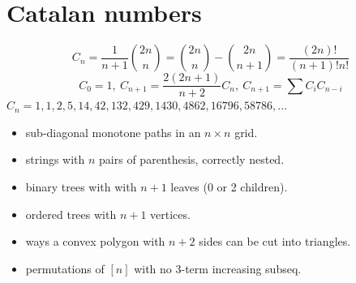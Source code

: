 \section{Catalan numbers}
	\[ C_n=\frac{1}{n+1}\binom{2n}{n}= \binom{2n}{n}-\binom{2n}{n+1} = \frac{(2n)!}{(n+1)!n!} \]
	\[ C_0=1,\ C_{n+1} = \frac{2(2n+1)}{n+2}C_n,\ C_{n+1}=\sum C_iC_{n-i} \]
	${C_n = 1, 1, 2, 5, 14, 42, 132, 429, 1430, 4862, 16796, 58786, \dots}$
	\begin{itemize}[noitemsep]
		\item sub-diagonal monotone paths in an $n\times n$ grid.
		\item strings with $n$ pairs of parenthesis, correctly nested.
		\item binary trees with with $n+1$ leaves (0 or 2 children).
		\item ordered trees with $n+1$ vertices.
		\item ways a convex polygon with $n+2$ sides can be cut into triangles.
		\item permutations of $[n]$ with no 3-term increasing subseq.
	\end{itemize}